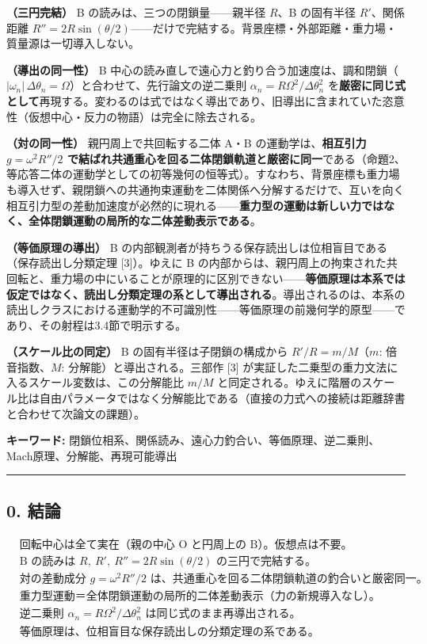 \documentclass[
  a4paper,
]{ltjsarticle}
\begin{document}
\textbf{（三円完結）} B の読みは、三つの閉鎖量------親半径 \(R\)、B
の固有半径 \(R'\)、関係距離
\(R''=2R\sin(\theta/2)\)------だけで完結する。背景座標・外部距離・重力場・質量源は一切導入しない。

\textbf{（導出の同一性）} B
中心の読み直しで遠心力と釣り合う加速度は、調和閉鎖（\(|\omega_n|\,\Delta\theta_n=\Omega\)）と合わせて、先行論文の逆二乗則
\(\alpha_n=R\Omega^2/\Delta\theta_n^2\)
を\textbf{厳密に同じ式として}再現する。変わるのは式ではなく導出であり、旧導出に含まれていた恣意性（仮想中心・反力の物語）は完全に除去される。

\textbf{（対の同一性）} 親円周上で共回転する二体 A・B
の運動学は、\textbf{相互引力 \(g=\omega^2 R''/2\)
で結ばれ共通重心を回る二体閉鎖軌道と厳密に同一}である（命題2、等応答二体の運動学としての初等幾何の恒等式）。すなわち、背景座標も重力場も導入せず、親閉鎖への共通拘束運動を二体関係へ分解するだけで、互いを向く相互引力型の差動加速度が必然的に現れる------\textbf{重力型の運動は新しい力ではなく、全体閉鎖運動の局所的な二体差動表示である}。

\textbf{（等価原理の導出）} B
の内部観測者が持ちうる保存読出しは位相盲目である（保存読出し分類定理
{[}3{]}）。ゆえに B
の内部からは、親円周上の拘束された共回転と、重力場の中にいることが原理的に区別できない------\textbf{等価原理は本系では仮定ではなく、読出し分類定理の系として導出される}。導出されるのは、本系の読出しクラスにおける運動学的不可識別性------等価原理の前幾何学的原型------であり、その射程は3.4節で明示する。

\textbf{（スケール比の同定）} B の固有半径は子閉鎖の構成から
\(R'/R=m/M\)（\(m\): 倍音指数、\(M\): 分解能）と導出される。三部作
{[}3{]} が実証した二乗型の重力文法に入るスケール変数は、この分解能比
\(m/M\)
と同定される。ゆえに階層のスケール比は自由パラメータではなく分解能比である（直接の力式への接続は距離辞書と合わせて次論文の課題）。

\textbf{キーワード:}
閉鎖位相系、関係読み、遠心力釣合い、等価原理、逆二乗則、Mach原理、分解能、再現可能導出

\begin{center}\rule{0.5\linewidth}{0.5pt}\end{center}

\subsection{0. 結論}\label{ux7d50ux8ad6}

\[
\boxed{
\begin{aligned}
&\text{回転中心は全て実在（親の中心 O と円周上の B）。仮想点は不要。}\\
&\text{B の読みは } R,\ R',\ R''=2R\sin(\theta/2) \text{ の三円で完結する。}\\
&\text{対の差動成分 } g=\omega^2 R''/2 \text{ は、共通重心を回る二体閉鎖軌道の釣合いと厳密同一。}\\
&\text{重力型運動＝全体閉鎖運動の局所的二体差動表示（力の新規導入なし）。}\\
&\text{逆二乗則 } \alpha_n=R\Omega^2/\Delta\theta_n^2 \text{ は同じ式のまま再導出される。}\\
&\text{等価原理は、位相盲目な保存読出しの分類定理の系である。}
\end{aligned}
}
\]
\end{document}
